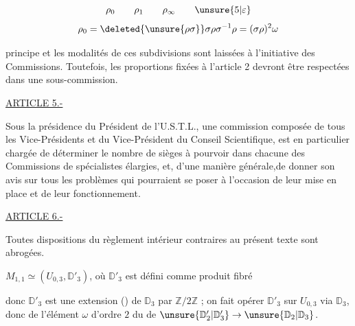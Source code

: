 
\[
\rho_0\qquad\rho_1\qquad\rho_\infty\qquad\unsure{5|\varepsilon}
\]
\[
\rho_0=\deleted{\unsure{\rho\sigma}}\sigma\rho\sigma^{-1}\rho
=(\sigma\rho)^2\omega
\]

principe et les modalités de ces subdivisions sont laissées à l'initiative des
Commissions. Toutefois, les proportions fixées à l'article 2 devront être respectées
dans une sous-commission.

\uline{ARTICLE 5.-}

Sous la présidence du Président de l'U.S.T.L., une commission composée
de tous les Vice-Présidents et du Vice-Président du Conseil Scientifique, est
en particulier chargée de déterminer le nombre de sièges à pourvoir dans chacune
des Commissions de spécialistes élargies, et, d'une manière générale,de
donner son avis sur tous les problèmes qui pourraient se poser à l'occasion
de leur mise en place et de leur fonctionnement.

\uline{ARTICLE 6.-}

Toutes dispositions du règlement intérieur contraires au présent texte
sont abrogées.

$M_{1,1}\simeq (U_{0,3},\mathbb D'_3)$, où $\mathbb D'_3$ est défini comme produit fibré



donc $\mathbb D'_3$ est une extension () de $\mathbb D_3$ par $\mathbb Z/2\mathbb Z$ ;  on fait opérer $\mathbb D'_3$ sur $U_{0,3}$ via $\mathbb D_3$, donc  de l'élément $\omega$ d'ordre $2$ du  de $\unsure{\mathbb D'_2|\mathbb D'_3}\to\unsure{\mathbb D_2|\mathbb D_3}$.

